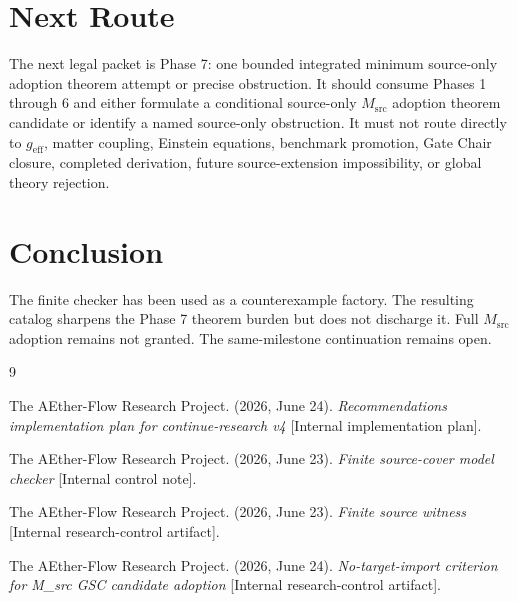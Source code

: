 \documentclass[11pt]{article}
\newcommand{\Msrc}{M_{\mathrm{src}}}
\newcommand{\geff}{g_{\mathrm{eff}}}
\begin{document}
\section{Next Route}

The next legal packet is Phase 7: one bounded integrated minimum source-only
adoption theorem attempt or precise obstruction. It should consume Phases 1
through 6 and either formulate a conditional source-only \(\Msrc\) adoption
theorem candidate or identify a named source-only obstruction. It must not
route directly to \(\geff\), matter coupling, Einstein equations, benchmark
promotion, Gate Chair closure, completed derivation, future source-extension
impossibility, or global theory rejection.

\section{Conclusion}

The finite checker has been used as a counterexample factory. The resulting
catalog sharpens the Phase 7 theorem burden but does not discharge it. Full
\(\Msrc\) adoption remains not granted. The same-milestone continuation
remains open.

\begin{thebibliography}{9}

The AEther-Flow Research Project. (2026, June 24). \emph{Recommendations
implementation plan for continue-research v4} [Internal implementation plan].

The AEther-Flow Research Project. (2026, June 23). \emph{Finite source-cover
model checker} [Internal control note].

The AEther-Flow Research Project. (2026, June 23). \emph{Finite source witness}
[Internal research-control artifact].

The AEther-Flow Research Project. (2026, June 24). \emph{No-target-import
criterion for M\_src GSC candidate adoption} [Internal research-control
artifact].

\end{thebibliography}
\end{document}
